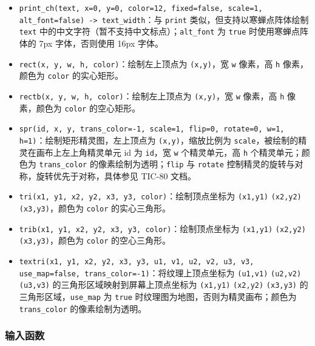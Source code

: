 \documentclass[UTF8]{ctexart}
\begin{document}
\begin{itemize}
    \item \texttt{print\_ch(text, x=0, y=0, color=12, fixed=false, scale=1, alt\_font=false) -> text\_width}：与 \texttt{print} 类似，但支持以寒蝉点阵体绘制 \texttt{text} 中的中文字符（暂不支持中文标点）；\texttt{alt\_font} 为 \texttt{true} 时使用寒蝉点阵体的 7px 字体，否则使用 16px 字体。
    \item \texttt{rect(x, y, w, h, color)}：绘制左上顶点为 \texttt{(x,y)}，宽 \texttt{w} 像素，高 \texttt{h} 像素，颜色为 \texttt{color} 的实心矩形。
    \item \texttt{rectb(x, y, w, h, color)}：绘制左上顶点为 \texttt{(x,y)}，宽 \texttt{w} 像素，高 \texttt{h} 像素，颜色为 \texttt{color} 的空心矩形。
    \item \texttt{spr(id, x, y, trans\_color=-1, scale=1, flip=0, rotate=0, w=1, h=1)}：绘制矩形精灵图，左上顶点为 \texttt{(x,y)}，缩放比例为 \texttt{scale}，被绘制的精灵在画布上左上角精灵单元 id 为 \texttt{id}，宽 \texttt{w} 个精灵单元，高 \texttt{h} 个精灵单元；颜色为 \texttt{trans\_color} 的像素绘制为透明；\texttt{flip} 与 \texttt{rotate} 控制精灵的旋转与对称，旋转优先于对称，具体参见 TIC-80 文档。
    \item \texttt{tri(x1, y1, x2, y2, x3, y3, color)}：绘制顶点坐标为 \texttt{(x1,y1)} \texttt{(x2,y2)} \texttt{(x3,y3)}，颜色为 \texttt{color} 的实心三角形。
    \item \texttt{trib(x1, y1, x2, y2, x3, y3, color)}：绘制顶点坐标为 \texttt{(x1,y1)} \texttt{(x2,y2)} \texttt{(x3,y3)}，颜色为 \texttt{color} 的空心三角形。
    \item \texttt{textri(x1, y1, x2, y2, x3, y3, u1, v1, u2, v2, u3, v3, use\_map=false, trans\_color=-1)}：将纹理上顶点坐标为 \texttt{(u1,v1)} \texttt{(u2,v2)} \texttt{(u3,v3)} 的三角形区域映射到屏幕上顶点坐标为 \texttt{(x1,y1)} \texttt{(x2,y2)} \texttt{(x3,y3)} 的三角形区域，\texttt{use\_map} 为 \texttt{true} 时纹理图为地图，否则为精灵画布；颜色为 \texttt{trans\_color} 的像素绘制为透明。
\end{itemize}

\subsubsection{输入函数}
\end{document}
